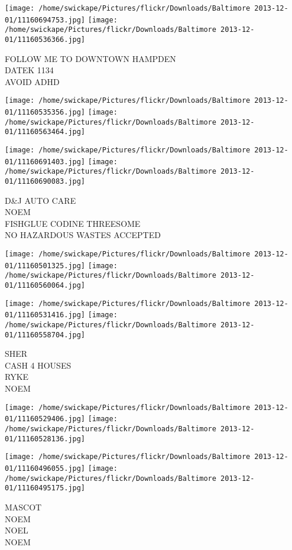 \documentclass[10pt,letterpaper]{article}
\begin{document}
\vspace{0.25in}
\texttt{[image: /home/swickape/Pictures/flickr/Downloads/Baltimore 2013-12-01/11160694753.jpg]}
\texttt{[image: /home/swickape/Pictures/flickr/Downloads/Baltimore 2013-12-01/11160536366.jpg]}

FOLLOW ME TO DOWNTOWN HAMPDEN\\
DATEK 1134\\
AVOID ADHD
\pagebreak

\texttt{[image: /home/swickape/Pictures/flickr/Downloads/Baltimore 2013-12-01/11160535356.jpg]}
\texttt{[image: /home/swickape/Pictures/flickr/Downloads/Baltimore 2013-12-01/11160563464.jpg]}

\texttt{[image: /home/swickape/Pictures/flickr/Downloads/Baltimore 2013-12-01/11160691403.jpg]}
\texttt{[image: /home/swickape/Pictures/flickr/Downloads/Baltimore 2013-12-01/11160690083.jpg]}

D\&J AUTO CARE\\
NOEM\\
FISHGLUE CODINE THREESOME\\
NO HAZARDOUS WASTES ACCEPTED
\pagebreak

\texttt{[image: /home/swickape/Pictures/flickr/Downloads/Baltimore 2013-12-01/11160501325.jpg]}
\texttt{[image: /home/swickape/Pictures/flickr/Downloads/Baltimore 2013-12-01/11160560064.jpg]}

\texttt{[image: /home/swickape/Pictures/flickr/Downloads/Baltimore 2013-12-01/11160531416.jpg]}
\texttt{[image: /home/swickape/Pictures/flickr/Downloads/Baltimore 2013-12-01/11160558704.jpg]}

SHER\\
CASH 4 HOUSES\\
RYKE\\
NOEM
\pagebreak

\texttt{[image: /home/swickape/Pictures/flickr/Downloads/Baltimore 2013-12-01/11160529406.jpg]}
\texttt{[image: /home/swickape/Pictures/flickr/Downloads/Baltimore 2013-12-01/11160528136.jpg]}

\texttt{[image: /home/swickape/Pictures/flickr/Downloads/Baltimore 2013-12-01/11160496055.jpg]}
\texttt{[image: /home/swickape/Pictures/flickr/Downloads/Baltimore 2013-12-01/11160495175.jpg]}

MASCOT\\
NOEM\\
NOEL\\
NOEM
\pagebreak
\end{document}
